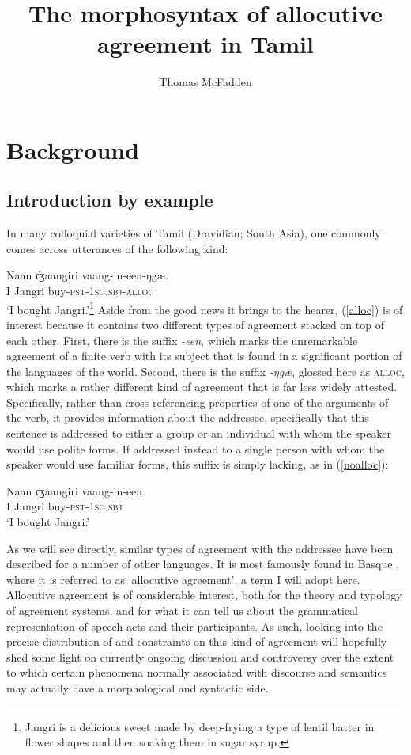 \documentclass[output=paper, modfonts, nonflat]{langsci/langscibook}
\title{The morphosyntax of allocutive agreement in Tamil}
\author{ Thomas McFadden\affiliation{Leibniz-Zentrum Allgemeine Sprachwissenschaft}}
\begin{document}
\maketitle


\section{Background}

\subsection{Introduction by example}

In many colloquial varieties of Tamil (Dravidian; South Asia), one
commonly comes across utterances of the following kind:

\ea\label{alloc}
\gll Naan ʤaangiri vaang-in-een-ŋgæ.\\
I Jangri buy-\textsc{pst}{}-1\textsc{sg.sbj}-\textsc{alloc}\\
\glt `I bought Jangri.'\footnote{Jangri is a delicious sweet made by
  deep-frying a type of lentil batter in flower shapes and then
  soaking them in sugar syrup.} 
\z 
%
Aside from the good news it brings to the hearer, (\ref{alloc}) is of
interest because it contains two different types of agreement stacked
on top of each other. First, there is the suffix \textit{-een}, which
marks the unremarkable agreement of a finite verb with its subject
that is found in a significant portion of the languages of the
world. Second, there is the suffix \textit{-ŋgæ}, glossed here as
\textsc{alloc}, which marks a rather different kind of agreement that
is far less widely attested. Specifically, rather than
cross-referencing properties of one of the arguments of the verb, it
provides information about the addressee, specifically that this
sentence is addressed to either a group or an individual with whom the
speaker would use polite forms. If addressed instead to a single
person with whom the speaker would use familiar forms, this suffix is
simply lacking, as in (\ref{noalloc}):

\ea\label{noalloc}
\gll Naan ʤaangiri vaang-in-een.\\
I Jangri buy-\textsc{pst}{}-1\textsc{sg.sbj}\\
\glt `I bought Jangri.'
\z 

\noindent As we will see directly, similar types of agreement with the addressee
have been described for a number of other languages. It is most
famously found in Basque \citep{oyharcabal:1993}, where it is referred
to as `allocutive agreement', a term I will adopt here. Allocutive
agreement is of considerable interest, both for the theory and
typology of agreement systems, and for what it can tell us about the
grammatical representation of speech acts and their participants. As
such, looking into the precise distribution of and constraints on this
kind of agreement will hopefully shed some light on currently ongoing
discussion and controversy over the extent to which certain phenomena
normally associated with discourse and semantics may actually have a
morphological and syntactic side.
\end{document}
